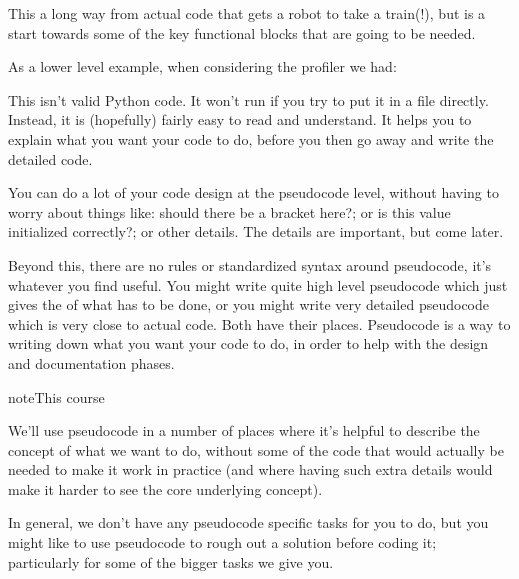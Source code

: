 \documentclass[letterpaper,10pt,british]{sphinxmanual}
\begin{document}
\sphinxAtStartPar
This a long way from actual code that gets a robot to take a train(!), but is a start towards some of the key functional blocks that are going to be needed.

\sphinxAtStartPar
As a lower level example, when considering the profiler we had:

\begin{sphinxVerbatim}[commandchars=\\\{\}]
  
  \PYG{p}{[}    \PYG{p}{]}
    
        
\end{sphinxVerbatim}

\sphinxAtStartPar
This isn’t valid Python code. It won’t run if you try to put it in a  file directly. Instead, it is (hopefully) fairly easy to read and understand. It helps you to explain what you want your code to do, before you then go away and write the detailed code.

\sphinxAtStartPar
You can do a lot of your code design at the pseudocode level, without having to worry about things like: should there be a bracket here?; or is this value initialized correctly?; or other details. The details are important, but come later.

\sphinxAtStartPar
Beyond this, there are no rules or standardized syntax around pseudocode, it’s whatever you find useful. You might write quite high level pseudocode which just gives the  of what has to be done, or you might write very detailed pseudocode which is very close to actual code. Both have their places. Pseudocode is a way to writing down what you want your code to do, in order to help with the design and documentation phases.

\begin{sphinxadmonition}{note}{This course}

\sphinxAtStartPar
We’ll use pseudocode in a number of places where it’s helpful to describe the concept of what we want to do, without some of the  code that would actually be needed to make it work in practice (and where having such extra details would make it harder to see the core underlying concept).

\sphinxAtStartPar
In general, we don’t have any pseudocode specific tasks for you to do, but you might like to use pseudocode to rough out a solution before coding it; particularly for some of the bigger tasks we give you.
\end{sphinxadmonition}
\end{document}
